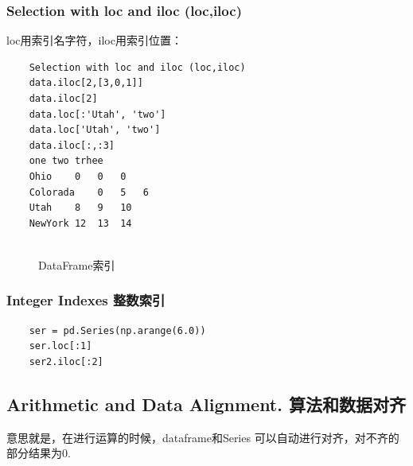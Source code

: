 \documentclass{article}
\begin{document}
\subsubsection{Selection with loc and iloc (loc,iloc)}
loc用索引名字符，iloc用索引位置：
\begin{lstlisting}
	Selection with loc and iloc (loc,iloc)
	data.iloc[2,[3,0,1]]
	data.iloc[2]
	data.loc[:'Utah', 'two']
	data.loc['Utah', 'two']
	data.iloc[:,:3]
	one	two	trhee
	Ohio	0	0	0
	Colorada	0	5	6
	Utah	8	9	10
	NewYork	12	13	14
	
\end{lstlisting}
\begin{figure}
	\centering
	\caption{DataFrame索引}
\end{figure}

\subsubsection{Integer Indexes 整数索引}
\begin{lstlisting}
	ser = pd.Series(np.arange(6.0))
	ser.loc[:1]
	ser2.iloc[:2]
\end{lstlisting}

\subsection{Arithmetic and Data Alignment. 算法和数据对齐}
意思就是，在进行运算的时候，dataframe和Series 可以自动进行对齐，对不齐的部分结果为0.
\end{document}
